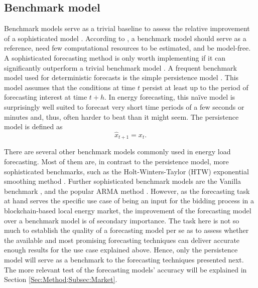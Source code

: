



\subsection{Benchmark model} \label{Sec:Method;Subsec:Benchmark}

Benchmark models serve as a trivial baseline to assess the relative improvement of a sophisticated model \citep{Meer:2018}. According to \citet{Pinson:2012}, a benchmark model should serve as a reference, need few computational resources to be estimated, and be model-free. A sophisticated forecasting method is only worth implementing if it can significantly outperform a trivial benchmark model \citep{Diagne:2013}. A frequent benchmark model used for deterministic forecasts is the simple persistence model \citep{Meer:2018}. This model assumes that the conditions at time $t$ persist at least up to the period of forecasting interest at time $t+h$. In energy forecasting, this na\"ive model is surprisingly well suited to forecast very short time periods of a few seconds or minutes \citep{Pinson:2012} and, thus, often harder to beat than it might seem. The persistence model is defined as
%
\begin{equation} \label{Eq:naivepred}
\widehat{x}_{t+1}=x_t.
\end{equation}

There are several other benchmark models commonly used in energy load forecasting. Most of them are, in contrast to the persistence model, more sophisticated benchmarks, such as the Holt-Winters-Taylor (HTW) exponential smoothing method \citep[see, e.g.,][]{Arora:2016}. Further sophisticated benchmark models are the Vanilla benchmark \citep{hong:2010}, and the popular ARMA method \citep{Box:1990}. However, as the forecasting task at hand serves the specific use case of being an input for the bidding process in a blockchain-based local energy market, the improvement of the forecasting model over a benchmark model is of secondary importance. The task here is not so much to establish the quality of a forecasting model per se as to assess whether the available and most promising forecasting techniques can deliver accurate enough results for the use case explained above. Hence, only the persistence model will serve as a benchmark to the forecasting techniques presented next. The more relevant test of the forecasting models' accuracy will be explained in Section \ref{Sec:Method;Subsec:Market}.



